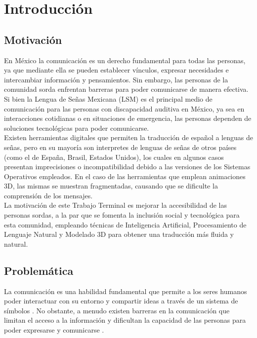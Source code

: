 \chapter{Introducción}
\section{Motivación}
En México la comunicación es un derecho fundamental para todas las personas, ya que mediante ella se pueden establecer vínculos, expresar necesidades e intercambiar información y pensamientos. Sin embargo, las personas de la comunidad sorda enfrentan barreras para poder comunicarse de manera efectiva. \\

Si bien la Lengua de Señas Mexicana (LSM) es el principal medio de comunicación para las personas con discapacidad auditiva en México, ya sea en interacciones cotidianas o en situaciones de emergencia, las personas dependen de soluciones tecnológicas para poder comunicarse. \\

Existen herramientas digitales que permiten la traducción de español a lenguas de señas, pero en su mayoría son interpretes de lenguas de señas de otros países (como el de España, Brasil, Estados Unidos), los cuales en algunos casos presentan imprecisiones o incompatibilidad debido a las versiones de los Sistemas Operativos empleados. En el caso de las herramientas que emplean animaciones 3D, las mismas se muestran fragmentadas, causando que se dificulte la comprensión de los mensajes.\\

La motivación de este Trabajo Terminal es mejorar la accesibilidad de las personas sordas, a la par que se fomenta la inclusión social y tecnológica para esta comunidad, empleando técnicas de Inteligencia Artificial, Procesamiento de Lenguaje Natural y Modelado 3D para obtener una traducción más fluida y natural.\\


\newpage
\section{Problemática}
La comunicación es una habilidad fundamental que permite a los seres humanos poder interactuar con su entorno y compartir ideas a través de un sistema de símbolos \cite{ref1}. No obstante, a menudo existen barreras en la comunicación que limitan el acceso a la información y dificultan la capacidad de las personas para poder expresarse y comunicarse \cite{ref2}. \\

